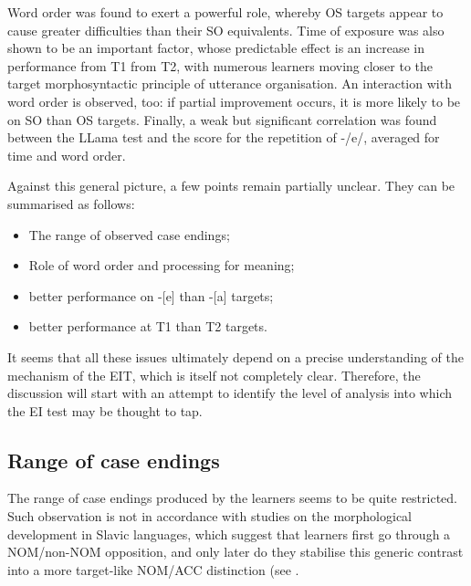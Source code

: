Word order was found to exert a powerful role, whereby OS targets appear to cause greater difficulties than their SO equivalents. Time of exposure was also shown to be an important factor, whose predictable effect is an increase in performance from T1 from T2, with numerous learners moving closer to the target morphosyntactic principle of utterance organisation. An interaction with word order is observed, too: if partial improvement occurs, it is more likely to be on SO than OS targets. Finally, a weak but significant correlation was found between the LLama test and the score for the repetition of -/e/, averaged for time and word order.

Against this general picture, a few points remain partially unclear. They can be summarised as follows:

\begin{itemize}
    \item The range of observed case endings;
    \item Role of word order and processing for meaning;
    \item better performance on -[e] than -[a] targets;
    \item better performance at T1 than T2 targets.
\end{itemize}

It seems that all these issues ultimately depend on a precise understanding of the mechanism of the EIT, which is itself not completely clear. Therefore, the discussion will start with an attempt to identify the level of analysis into which the EI test may be thought to tap. 

\subsection{Range of case endings}\label{sec:08:2.1}

The range of case endings produced by the learners seems to be quite restricted. Such observation is not in accordance with studies on the morphological development in Slavic languages, which suggest that learners first go through a NOM/non-NOM opposition, and only later do they stabilise this generic contrast into a more target-like NOM/ACC distinction (see .

